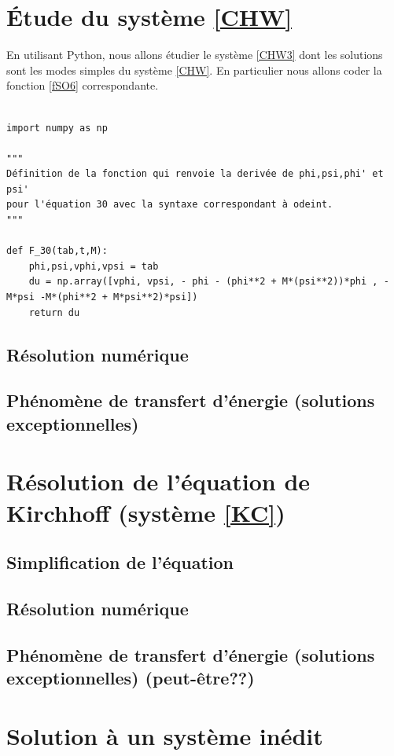 \documentclass[11pt,a4paper]{article}
\begin{document}
\section{Étude du système \eqref{CHW}}

En utilisant Python, nous allons étudier le système \eqref{CHW3} dont les solutions sont les modes simples du système \eqref{CHW}.
En particulier nous allons coder la fonction \eqref{fSO6} correspondante.


\begin{lstlisting}

import numpy as np

"""
Définition de la fonction qui renvoie la derivée de phi,psi,phi' et psi' 
pour l'équation 30 avec la syntaxe correspondant à odeint.
"""

def F_30(tab,t,M):
    phi,psi,vphi,vpsi = tab
    du = np.array([vphi, vpsi, - phi - (phi**2 + M*(psi**2))*phi , -M*psi -M*(phi**2 + M*psi**2)*psi])
    return du

\end{lstlisting}





    \subsection{Résolution numérique}
    
    \subsection{Phénomène de transfert d'énergie (solutions exceptionnelles)}
\section{Résolution de l'équation de Kirchhoff (système \eqref{KC})}
    \subsection{Simplification de l'équation}
    \subsection{Résolution numérique}
    \subsection{Phénomène de transfert d'énergie (solutions exceptionnelles) (peut-être??)}

\section{Solution à un système inédit}
\end{document}
